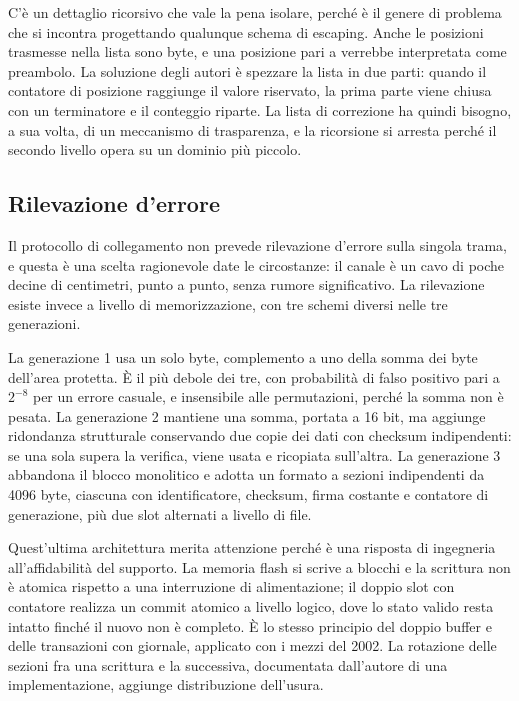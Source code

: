 \documentclass[11pt,a4paper]{article}
\begin{document}
C'è un dettaglio ricorsivo che vale la pena isolare, perché è il genere di problema che si incontra progettando qualunque schema di escaping. Anche le posizioni trasmesse nella lista sono byte, e una posizione pari a  verrebbe interpretata come preambolo. La soluzione degli autori è spezzare la lista in due parti: quando il contatore di posizione raggiunge il valore riservato, la prima parte viene chiusa con un terminatore e il conteggio riparte. La lista di correzione ha quindi bisogno, a sua volta, di un meccanismo di trasparenza, e la ricorsione si arresta perché il secondo livello opera su un dominio più piccolo.

\subsection{Rilevazione d'errore}

Il protocollo di collegamento non prevede rilevazione d'errore sulla singola trama, e questa è una scelta ragionevole date le circostanze: il canale è un cavo di poche decine di centimetri, punto a punto, senza rumore significativo. La rilevazione esiste invece a livello di memorizzazione, con tre schemi diversi nelle tre generazioni.

La generazione 1 usa un solo byte, complemento a uno della somma dei byte dell'area protetta. È il più debole dei tre, con probabilità di falso positivo pari a $2^{-8}$ per un errore casuale, e insensibile alle permutazioni, perché la somma non è pesata. La generazione 2 mantiene una somma, portata a 16 bit, ma aggiunge ridondanza strutturale conservando due copie dei dati con checksum indipendenti: se una sola supera la verifica, viene usata e ricopiata sull'altra. La generazione 3 abbandona il blocco monolitico e adotta un formato a sezioni indipendenti da 4096 byte, ciascuna con identificatore, checksum, firma costante e contatore di generazione, più due slot alternati a livello di file.

Quest'ultima architettura merita attenzione perché è una risposta di ingegneria all'affidabilità del supporto. La memoria flash si scrive a blocchi e la scrittura non è atomica rispetto a una interruzione di alimentazione; il doppio slot con contatore realizza un commit atomico a livello logico, dove lo stato valido resta intatto finché il nuovo non è completo. È lo stesso principio del doppio buffer e delle transazioni con giornale, applicato con i mezzi del 2002. La rotazione delle sezioni fra una scrittura e la successiva, documentata dall'autore di una implementazione, aggiunge distribuzione dell'usura.
\end{document}
